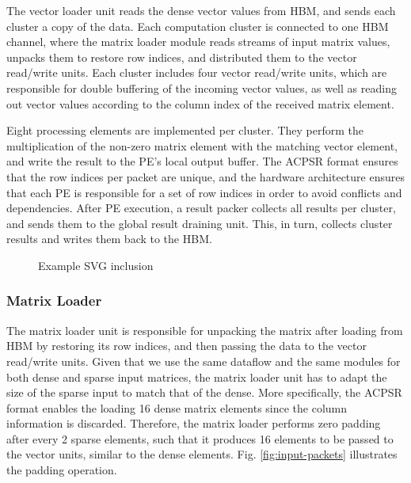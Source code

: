 \documentclass[manuscript,screen,review]{acmart}
\begin{document}
The vector loader unit reads the dense vector values from HBM, and sends each cluster a copy of the data. Each computation cluster is connected to one HBM channel, where the matrix loader module reads streams of input matrix values, unpacks them to restore row indices, and distributed them to the vector read/write units. Each cluster includes four vector read/write units, which are responsible for double buffering of the incoming vector values, as well as reading out vector values according to the column index of the received matrix element. 

Eight processing elements are implemented per cluster. They perform the multiplication of the non-zero matrix element with the matching vector element, and write the result to the PE's local output buffer. The ACPSR format ensures that the row indices per packet are unique, and the hardware architecture ensures that each PE is responsible for a set of row indices in order to avoid conflicts and dependencies. After PE execution, a result packer collects all results per cluster, and sends them to the global result draining unit. This, in turn, collects cluster results and writes them back to the HBM.






\begin{figure}[h]
	\centering
	
	\caption{Example SVG inclusion}
	\label{fig:architecture}
\end{figure}

\subsubsection{Matrix Loader}
The matrix loader unit is responsible for unpacking the matrix after loading from HBM by restoring its row indices, and then passing the data to the vector read/write units. Given that we use the same dataflow and the same modules for both dense and sparse input matrices,  the matrix loader unit has to adapt the size of the sparse input to match that of the dense. More specifically, the ACPSR format enables the loading 16 dense matrix elements since the column information is discarded. Therefore, the matrix loader performs zero padding after every 2 sparse elements, such that it produces 16 elements to be passed to the vector units, similar to the dense elements. Fig. \ref{fig:input-packets} illustrates the padding operation.
\end{document}
